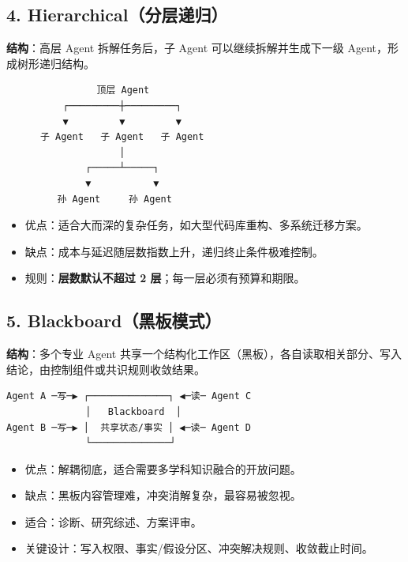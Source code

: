 \documentclass[9pt,a4paper,twocolumn]{ctexart}
\begin{document}
\subsection*{4. Hierarchical（分层递归）}


\textbf{结构}：高层 Agent 拆解任务后，子 Agent 可以继续拆解并生成下一级 Agent，形成树形递归结构。



\begin{lstlisting}
                顶层 Agent
          ┌─────────┼─────────┐
          ▼         ▼         ▼
      子 Agent   子 Agent   子 Agent
                    │
              ┌─────┴─────┐
              ▼           ▼
         孙 Agent     孙 Agent
\end{lstlisting}


\begin{itemize}[itemsep=1pt, topsep=2pt]
  \item 优点：适合大而深的复杂任务，如大型代码库重构、多系统迁移方案。
  \item 缺点：成本与延迟随层数指数上升，递归终止条件极难控制。
  \item 规则：\textbf{层数默认不超过 2 层}；每一层必须有预算和期限。
\end{itemize}


\subsection*{5. Blackboard（黑板模式）}


\textbf{结构}：多个专业 Agent 共享一个结构化工作区（黑板），各自读取相关部分、写入结论，由控制组件或共识规则收敛结果。



\begin{lstlisting}
Agent A ─写─▶ ┌──────────────┐ ◀─读─ Agent C
              │   Blackboard  │
Agent B ─写─▶ │  共享状态/事实 │ ◀─读─ Agent D
              └──────────────┘
\end{lstlisting}


\begin{itemize}[itemsep=1pt, topsep=2pt]
  \item 优点：解耦彻底，适合需要多学科知识融合的开放问题。
  \item 缺点：黑板内容管理难，冲突消解复杂，最容易被忽视。
  \item 适合：诊断、研究综述、方案评审。
  \item 关键设计：写入权限、事实/假设分区、冲突解决规则、收敛截止时间。
\end{itemize}
\end{document}
